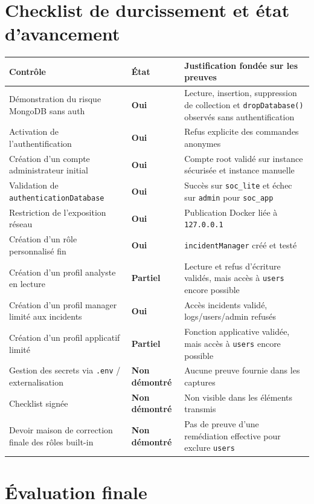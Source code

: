 \documentclass[11pt,a4paper]{article}
\newcommand{\statusok}{\textcolor{BoxGreen}{\textbf{Oui}}}
\newcommand{\statuspartial}{\textcolor{BoxOrange}{\textbf{Partiel}}}
\newcommand{\statusno}{\textcolor{red!70!black}{\textbf{Non démontré}}}
\begin{document}
\section{Checklist de durcissement et état d'avancement}

\begin{longtable}{p{6cm}C{2.4cm}p{5.8cm}}
\toprule
\textbf{Contrôle} & \textbf{État} & \textbf{Justification fondée sur les preuves} \\
\midrule
Démonstration du risque MongoDB sans auth & \statusok & Lecture, insertion, suppression de collection et \texttt{dropDatabase()} observés sans authentification \\
Activation de l'authentification & \statusok & Refus explicite des commandes anonymes \\
Création d'un compte administrateur initial & \statusok & Compte root validé sur instance sécurisée et instance manuelle \\
Validation de \texttt{authenticationDatabase} & \statusok & Succès sur \texttt{soc\_lite} et échec sur \texttt{admin} pour \texttt{soc\_app} \\
Restriction de l'exposition réseau & \statusok & Publication Docker liée à \texttt{127.0.0.1} \\
Création d'un rôle personnalisé fin & \statusok & \texttt{incidentManager} créé et testé \\
Création d'un profil analyste en lecture & \statuspartial & Lecture et refus d'écriture validés, mais accès à \texttt{users} encore possible \\
Création d'un profil manager limité aux incidents & \statusok & Accès incidents validé, logs/users/admin refusés \\
Création d'un profil applicatif limité & \statuspartial & Fonction applicative validée, mais accès à \texttt{users} encore possible \\
Gestion des secrets via \texttt{.env} / externalisation & \statusno & Aucune preuve fournie dans les captures \\
Checklist signée & \statusno & Non visible dans les éléments transmis \\
Devoir maison de correction finale des rôles built-in & \statusno & Pas de preuve d'une remédiation effective pour exclure \texttt{users} \\
\bottomrule
\end{longtable}

\section{Évaluation finale}
\end{document}
